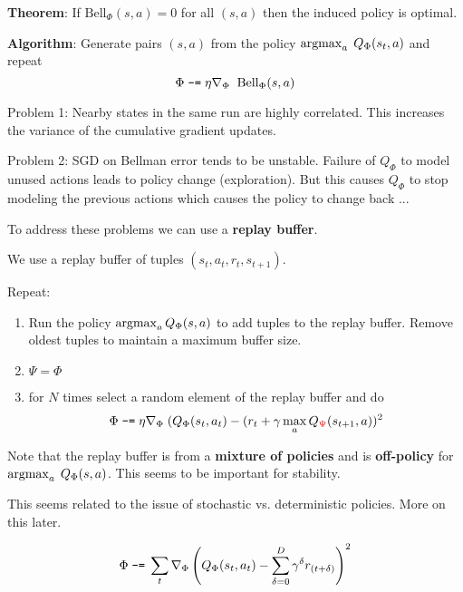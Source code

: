 {{\bf Theorem}: If $\mathrm{Bell}_\Phi(s,a) = 0$ for all $(s,a)$ then the induced policy is optimal.

\vfill
{\bf Algorithm}: Generate pairs $(s,a)$ from the policy $\operatorname*{argmax}_a\;Q_\Phi(s_t,a)$ and repeat
$$\Phi \;\mbox{\tt -=}\; \eta \nabla_\Phi \;\; \mathrm{Bell}_\Phi(s,a)$$



Problem 1: Nearby states in the same run are highly correlated.  This increases the variance of the cumulative gradient updates.

\vfill
Problem 2: SGD on Bellman error tends to be unstable. Failure of $Q_\Phi$ to model unused actions leads to policy change (exploration).
But this causes $Q_\Phi$ to stop modeling the previous actions
which causes the policy to change back ...

\vfill
To address these problems we can use a {\bf replay buffer}.


We use a replay buffer of tuples $(s_t,a_t,r_t,s_{t+1})$.

\vfill
Repeat:

\vfill
\begin{enumerate}

\item Run the policy $\operatorname*{argmax}_a Q_\Phi(s,a)$ to add tuples to the replay buffer.  Remove oldest tuples to maintain a maximum buffer size.

\item {\color{red} $\Psi = \Phi$}
  
\item for $N$ times select a random element of the replay buffer and do
$$\Phi \;\mbox{\tt -=} \; \eta \nabla_\Phi\;(Q_\Phi(s_t,a_t) - (r_t + \gamma \max_{a} Q_{\color{red} \Psi}(s_{t+1},a))^2$$
\end{enumerate}


Note that the replay buffer is from a {\bf mixture of policies} and is {\bf off-policy} for $\operatorname*{argmax}_a\;Q_\Phi(s,a)$.  This seems to be important for stability.

\vfill
This seems related to the issue of stochastic vs. deterministic policies.  More on this later.


$$\Phi \;\mbox{\tt -=} \;\sum_t \nabla_\Phi \left(Q_\Phi(s_t,a_t) - \sum_{\delta = 0}^{D} \gamma^\delta r_{(t+\delta)}\right)^2$$

}
